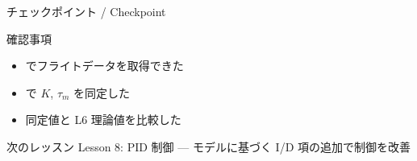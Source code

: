 \documentclass[aspectratio=169, 14pt]{beamer}
\begin{document}
\begin{frame}{チェックポイント / Checkpoint}
  \begin{alertblock}{確認事項}
    \begin{itemize}
      \item[$\square$]  でフライトデータを取得できた
      \item[$\square$]  で $K$, $\tau_m$ を同定した
      \item[$\square$] 同定値と L6 理論値を比較した
    \end{itemize}
  \end{alertblock}

  \vspace{1em}

  \begin{block}{次のレッスン}
    Lesson 8: PID 制御 --- モデルに基づく I/D 項の追加で制御を改善
  \end{block}
\end{frame}
\end{document}
